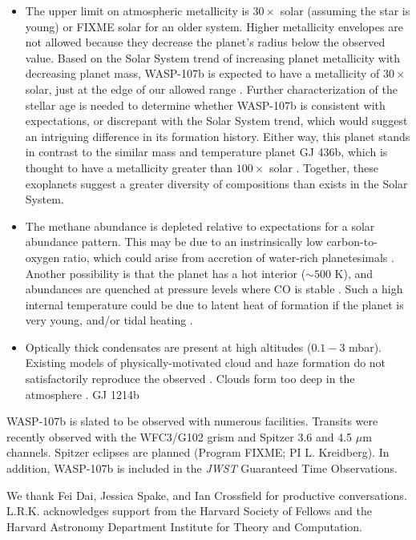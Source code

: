 \documentclass[twocolumn]{aastex61}
\begin{document}
\begin{itemize}
\item{The upper limit on atmospheric metallicity is $30\times$ solar (assuming the star is young) or FIXME solar for an older system.  Higher metallicity envelopes are not allowed because they decrease the planet's radius below the observed value.  Based on the Solar System trend of increasing planet metallicity with decreasing planet mass, WASP-107b is expected to have a metallicity of $30\times$ solar, just at the edge of our allowed range \citep{kreidberg14b}. Further characterization of the stellar age is needed to determine whether WASP-107b is consistent with expectations, or discrepant with the Solar System trend, which would suggest an intriguing difference in its formation history. Either way, this planet stands in contrast to the similar mass and temperature planet GJ 436b, which is thought to have a metallicity greater than $100\times$ solar \citep{morley17}. Together, these exoplanets suggest a greater diversity of compositions than exists in the Solar System.}
\item{The methane abundance is depleted relative to expectations for a solar abundance pattern. This may be due to an instrinsically low carbon-to-oxygen ratio, which could arise from accretion of water-rich planetesimals \citep{mordasini16, espinoza17}.  Another possibility is that the planet has a hot interior ($\sim500$ K), and abundances are quenched at pressure levels where CO is stable \citep[as observed in some directly imaged planets;][]{skemer14, zahnle14}. Such a high internal temperature could be due to latent heat of formation if the planet is very young, and/or tidal heating \citep{fortney08, morley17}.} 
\item{Optically thick condensates are present at high altitudes ($0.1 - 3$ mbar).  Existing models of physically-motivated cloud and haze formation do not satisfactorily reproduce the observed . Clouds form too deep in the atmosphere . \citep{crossfield17}} GJ 1214b
\end{itemize}


WASP-107b is slated to be observed with numerous facilities. Transits were recently observed with the WFC3/G102 grism and Spitzer 3.6 and 4.5 $\mu$m channels. Spitzer eclipses are planned (Program FIXME; PI L. Kreidberg). In addition, WASP-107b is included in the \emph{JWST} Guaranteed Time Observations.


\acknowledgments
We thank Fei Dai, Jessica Spake, and Ian Crossfield for productive conversations. L.R.K. acknowledges support from the Harvard Society of Fellows and the Harvard Astronomy Department Institute for Theory and Computation.
\end{document}
